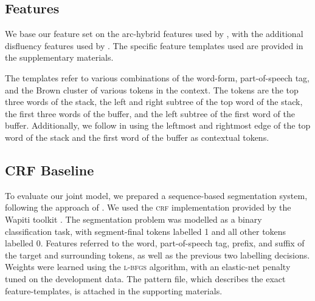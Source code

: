 \documentclass[11pt,letterpaper]{article}
\begin{document}
\subsection{Features}

We base our feature set on the arc-hybrid features used by
\citet{goldberg:13},
with the additional disfluency features used by \citet{honnibal:14}.  The
specific feature templates used are provided in the supplementary materials.

The templates refer to various combinations of the word-form, part-of-speech tag,
and the Brown cluster \citep{brown:92} of various tokens
in the context.  The tokens are the top three words of the stack, the left and
right subtree of the top word of the stack, the first three words of the buffer,
and the left subtree of the first word of the buffer.  Additionally, we follow
\citet{honnibal:14} in using the leftmost and rightmost edge of the top word
of the stack and the first word of the buffer as contextual tokens.


\subsection{CRF Baseline}
\label{sec:crf}

To evaluate our joint model, we prepared a sequence-based segmentation system,
following the approach of \citet{liu:05}.  We used the \textsc{crf} implementation
provided by the Wapiti toolkit \citep{wapiti}.
The segmentation problem was modelled as a binary classification task, with
segment-final tokens labelled 1 and all other tokens labelled 0.
Features referred to the word, part-of-speech tag, prefix, and suffix of the
target and surrounding tokens, as well as the previous two labelling decisions.
Weights were learned using the \textsc{l-bfgs} algorithm,
with an elastic-net penalty tuned on the development data.  The pattern file,
which describes the exact feature-templates, is attached in the supporting
materials.
\end{document}
